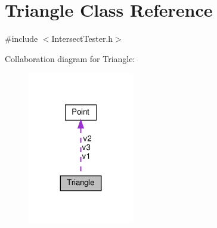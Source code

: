 \hypertarget{class_triangle}{}\section{Triangle Class Reference}
\label{class_triangle}


{\ttfamily \#include $<$Intersect\+Tester.\+h$>$}



Collaboration diagram for Triangle\+:\nopagebreak
\begin{figure}[H]
\begin{center}
\leavevmode
\includegraphics[width=131pt]{class_triangle__coll__graph}
\end{center}
\end{figure}
